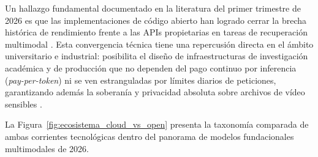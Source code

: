 Un hallazgo fundamental documentado en la literatura del primer trimestre de 2026 es que las implementaciones de código abierto han logrado cerrar la brecha histórica de rendimiento frente a las APIs propietarias en tareas de recuperación multimodal \cite{qwen3_vl_emb2026}. %
Esta convergencia técnica tiene una repercusión directa en el ámbito universitario e industrial: posibilita el diseño de infraestructuras de investigación académica y de producción que no dependen del pago continuo por inferencia (\textit{pay-per-token}) ni se ven estranguladas por límites diarios de peticiones, garantizando además la soberanía y privacidad absoluta sobre archivos de vídeo sensibles \cite{qwen3_vl_emb2026}. %

La Figura~\ref{fig:ecosistema_cloud_vs_open} presenta la taxonomía comparada de ambas corrientes tecnológicas dentro del panorama de modelos fundacionales multimodales de 2026. %

